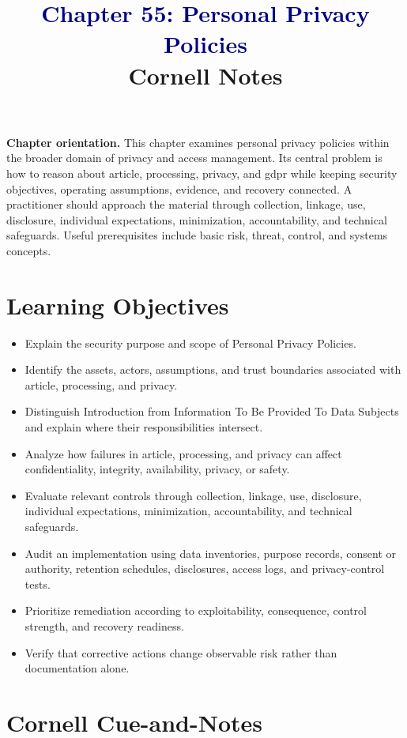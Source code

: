 \documentclass[11pt]{article}
\title{\textcolor{Navy}{Chapter 55: Personal Privacy Policies}\\[2mm]\large Cornell Notes}
\author{}
\date{}
\begin{document}
\maketitle
\thispagestyle{fancy}
\vspace{-1.5em}
\begin{orientationbox}
\textbf{Chapter orientation.} This chapter examines personal privacy policies within the broader domain of privacy and access management. Its central problem is how to reason about article, processing, privacy, and gdpr while keeping security objectives, operating assumptions, evidence, and recovery connected. A practitioner should approach the material through collection, linkage, use, disclosure, individual expectations, minimization, accountability, and technical safeguards. Useful prerequisites include basic risk, threat, control, and systems concepts.
\end{orientationbox}
\section*{Learning Objectives}
\begin{itemize}
\item Explain the security purpose and scope of Personal Privacy Policies.
\item Identify the assets, actors, assumptions, and trust boundaries associated with article, processing, and privacy.
\item Distinguish Introduction from Information To Be Provided To Data Subjects and explain where their responsibilities intersect.
\item Analyze how failures in article, processing, and privacy can affect confidentiality, integrity, availability, privacy, or safety.
\item Evaluate relevant controls through collection, linkage, use, disclosure, individual expectations, minimization, accountability, and technical safeguards.
\item Audit an implementation using data inventories, purpose records, consent or authority, retention schedules, disclosures, access logs, and privacy-control tests.
\item Prioritize remediation according to exploitability, consequence, control strength, and recovery readiness.
\item Verify that corrective actions change observable risk rather than documentation alone.
\end{itemize}
\section*{Cornell Cue-and-Notes}
\end{document}
